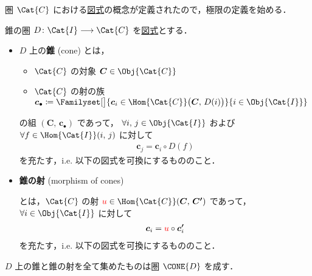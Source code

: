\documentclass[geometry_main]{subfiles}
\begin{document}
圏 $\Cat{C}$ における\hyperref[def:diagram]{図式}の概念が定義されたので，極限の定義を始める．
\begin{mydef}[label=def:Cone, breakable]{錐の圏}
	$D \colon \Cat{I} \lto \Cat{C}$ を\hyperref[def:diagram]{図式}とする．
	\begin{itemize}
		\item $D$ 上の\textbf{錐} (cone) とは，
		\begin{itemize}
			\item $\Cat{C}$ の対象 $\bm{C} \in \Obj{\Cat{C}}$
			\item $\Cat{C}$ の射の族 $\bm{c}_\bullet \coloneqq \Familyset[\big]{\bm{c}_i \in \Hom{\Cat{C}}\bigl(\bm{C},\, D(i)\bigr)}{i \in \Obj{\Cat{I}}}$
		\end{itemize}
		の組 $(\bm{C},\, \bm{c}_\bullet)$ であって，
		$\forall i,\, j \in \Obj{\Cat{I}}$ および $\forall f \in \Hom{\Cat{I}}(i,\, j)$ に対して
		\begin{align}
			\bm{c}_j = \bm{c}_i \circ D(f)
		\end{align}
		を充たす，i.e. 以下の図式を可換にするもののこと．
		\begin{center}
		\end{center}
		\item \textbf{錐の射} (morphism of cones) 
		\begin{center}
		\end{center}
		とは，$\Cat{C}$ の射 $\textcolor{red}{u} \in \Hom{\Cat{C}} (\bm{C},\, \bm{C'})$ であって，$\forall i \in \Obj{\Cat{I}}$ に対して
		\begin{align}
			\bm{c}_i = \textcolor{red}{u} \circ \bm{c'}_i
		\end{align}
		を充たす，i.e. 以下の図式を可換にするもののこと．
		\begin{center}
		\end{center}
	\end{itemize}
	$D$ 上の錐と錐の射を全て集めたものは圏 $\CONE{D}$ を成す．
\end{mydef}
\end{document}
